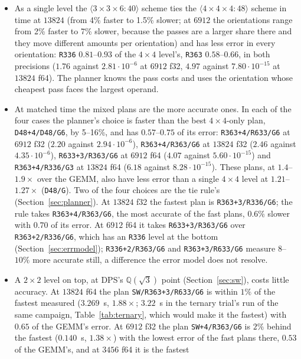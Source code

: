 \documentclass[11pt]{article}
\newcommand{\mm}[1]{\langle #1\rangle}
\newcommand{\lv}[1]{\texttt{#1}}
\begin{document}
\begin{itemize}
\item As a single level the $\mm{3\times3\times6:40}$ scheme ties the $\mm{4\times4\times4:48}$ scheme
  in time at $13824$ (from 4\% faster to 1.5\% slower; at $6912$ the orientations range from 2\%
  faster to 7\% slower, because the passes are a larger share there and they
  move different amounts per orientation) and has less error in every orientation: \lv{R336} $0.81$--$0.93$ of the $4\times4$ level's, \lv{R363} $0.58$--$0.66$, in both precisions
  ($1.76$ against $2.81\cdot10^{-6}$ at $6912$ f32, $4.97$ against
  $7.80\cdot10^{-15}$ at $13824$ f64).  The planner knows the pass costs and
  uses the orientation whose cheapest pass faces the largest operand.
\item At matched time the mixed plans are the more accurate ones.  In each of
  the four cases the planner's choice is faster than the best
  $4\times4$-only plan, \lv{D48+4/D48/G6}, by 5--16\%, and has $0.57$--$0.75$ of its error: \lv{R363+4/R633/G6} at $6912$ f32 ($2.20$
  against $2.94\cdot10^{-6}$), \lv{R363+4/R363/G6} at $13824$ f32 ($2.46$
  against $4.35\cdot10^{-6}$), \lv{R633+3/R363/G6} at $6912$ f64 ($4.07$
  against $5.60\cdot10^{-15}$) and \lv{R363+4/R336/G3} at $13824$ f64 ($6.18$
  against $8.28\cdot10^{-15}$).  These plans, at $1.4$--$1.9\times$ over the
  GEMM, also have less error than a single $4\times4$ level at
  $1.21$--$1.27\times$ (\lv{D48/G}).  Two of the four choices are the tie rule's (Section~\ref{sec:planner}).  At $13824$ f32 the fastest plan is \lv{R363+3/R336/G6}; the rule takes \lv{R363+4/R363/G6}, the most accurate of the
  fast plans, 0.6\% slower with $0.70$ of its error.  At $6912$ f64 it takes \lv{R633+3/R363/G6} over \lv{R363+2/R336/G6}, which has an \lv{R336} level at the bottom (Section~\ref{sec:errmodel}); \lv{R336+2/R363/G6} and \lv{R363+3/R633/G6} measure $8$--$10\%$ more accurate still, a difference the error model does not resolve.
\item A $2\times2$ level on top, at DPS's $\mathbb{Q}(\sqrt3)$ point
  (Section~\ref{sec:sw}), costs little accuracy.  At $13824$ f64 the plan
  \lv{SW/R363+3/R633/G6} is within $1\%$ of the fastest measured ($3.269$~s,
  $1.88\times$; $3.22$~s in the ternary trial's run of the same campaign,
  Table~\ref{tab:ternary}, which would make it the fastest) with $0.65$ of
  the GEMM's error.  At $6912$ f32 the plan \lv{SW+4/R363/G6} is $2\%$ behind
  the fastest ($0.140$~s, $1.38\times$) with the lowest error of the fast
  plans there, $0.53$ of the GEMM's, and at $3456$ f64 it is the fastest

\end{itemize}
\end{document}
